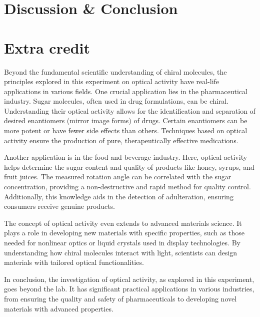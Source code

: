 \documentclass[10pt]{article}
\begin{document}
\section{Discussion \& Conclusion}

\section{Extra credit}
Beyond the fundamental scientific understanding of chiral molecules, the principles explored in this experiment on optical activity have real-life applications in various fields. One crucial application lies in the pharmaceutical industry. Sugar molecules, often used in drug formulations, can be chiral. Understanding their optical activity allows for the identification and separation of desired enantiomers (mirror image forms) of drugs. Certain enantiomers can be more potent or have fewer side effects than others. Techniques based on optical activity ensure the production of pure, therapeutically effective medications.

Another application is in the food and beverage industry. Here, optical activity helps determine the sugar content and quality of products like honey, syrups, and fruit juices. The measured rotation angle can be correlated with the sugar concentration, providing a non-destructive and rapid method for quality control. Additionally, this knowledge aids in the detection of adulteration, ensuring consumers receive genuine products.

The concept of optical activity even extends to advanced materials science. It plays a role in developing new materials with specific properties, such as those needed for nonlinear optics or liquid crystals used in display technologies. By understanding how chiral molecules interact with light, scientists can design materials with tailored optical functionalities.

In conclusion, the investigation of optical activity, as explored in this experiment, goes beyond the lab. It has significant practical applications in various industries, from ensuring the quality and safety of pharmaceuticals to developing novel materials with advanced properties.

\printbibliography
\end{document}
